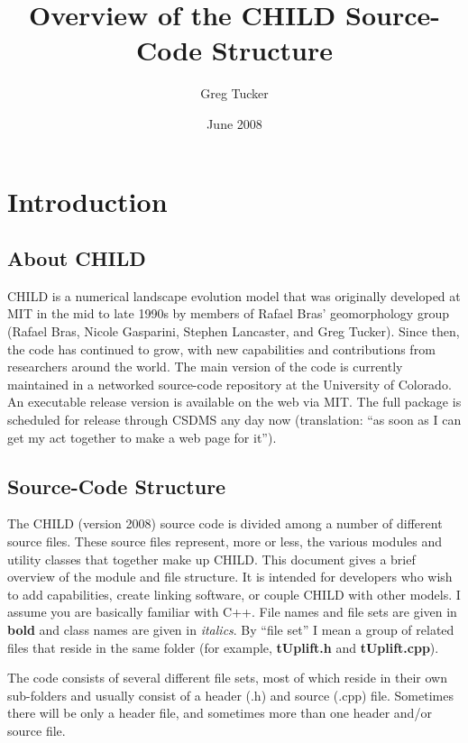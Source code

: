 \documentclass[12pt]{article}
\title{Overview of the CHILD Source-Code Structure}
\author{Greg Tucker}
\date{June 2008} %
\begin{document}
\maketitle
\tableofcontents

\section{Introduction}

\subsection{About CHILD}

CHILD is a numerical landscape evolution model that was originally developed at MIT in the mid to late 1990s by members of Rafael Bras' geomorphology group (Rafael Bras, Nicole Gasparini, Stephen Lancaster, and Greg Tucker). Since then, the code has continued to grow, with new capabilities and contributions from researchers around the world. The main version of the code is currently maintained in a networked source-code repository at the University of Colorado. An executable release version is available on the web via MIT. The full package is scheduled for release through CSDMS any day now (translation: ``as soon as I can get my act together to make a web page for it'').

\subsection{Source-Code Structure}

The CHILD (version 2008) source code is divided among a number of different 
source files. These source files represent, more or less, the various modules 
and utility classes that together make up CHILD. This document gives a brief 
overview of the module and file structure. It is intended for developers who 
wish to add capabilities, create linking software, or couple CHILD with other 
models. I assume you are basically familiar with C++. File names and file sets 
are given in {\bf bold} and class names are given in {\em italics}. By 
``file set'' I mean a group of related files that reside in the same folder 
(for example, {\bf tUplift.h} and {\bf tUplift.cpp}).

The code consists of several different file sets, most of which reside in their own sub-folders and usually consist of a header (.h) and source (.cpp) file. Sometimes there will be only a header file, and sometimes more than one header and/or source file.
\end{document}
